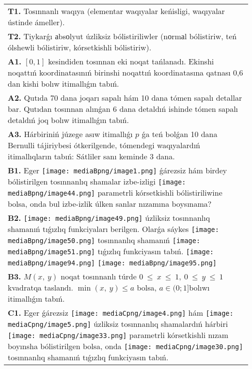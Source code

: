 \documentclass{article}
\begin{document}
\begin{tabular}{m{17cm}}
\textbf{T1.} Tosınnanlı waqıya (elementar waqıyalar keńisligi, waqıyalar ústinde ámeller).
 \\
\textbf{T2.} Tiykarǵı аbsоlyut úzliksiz bólistiriliwler (nоrmаl bólistiriw, teń ólshewli bólistiriw, kórsetkishli bólistiriw). 
 \\
\textbf{A1.} $\left[ 0,1 \right]$ kesindiden tosınnan eki noqat tańlanadı. Ekinshi noqattıń koordinatasınıń birinshi noqattıń koordinatasına qatnası 0,6 dan kishi bolıw itimallıǵın tabıń.
 \\
\textbf{A2.} Qutıda 70 dana joqarı sapalı hám 10 dana tómen sapalı detallar bar. Qutıdan tosınnan alınǵan 6 dana detaldıń ishinde tómen sapalı detaldıń joq bolıw itimallıǵın tabıń.
 \\
\textbf{A3.} Hárbiriniń júzege asıw itimallıǵı $p$ ǵa teń bolǵan 10 dana Bernulli tájiriybesi ótkerilgende, tómendegi waqıyalardıń itimallıqların tabıń: Sátliler sanı keminde 3 dana.
 \\
\textbf{B1.} Eger \texttt{[image: mediaBpng/image1.png]} ǵárezsiz hám birdey bólistirilgen tosınnanlıq shamalar izbe-izligi \texttt{[image: mediaBpng/image44.png]} parametrli kórsetkishli bólistiriliwine bolsa, onda bul izbe-izlik úlken sanlar nızamına boysınama?
 \\
\textbf{B2.} \texttt{[image: mediaBpng/image49.png]} úzliksiz tosınnanlıq shamanıń tıǵızlıq funkciyaları berilgen. Olarǵa sáykes \texttt{[image: mediaBpng/image50.png]} tosınnanlıq shamanıń \texttt{[image: mediaBpng/image51.png]} tıǵızlıq funkciyasın tabıń. \texttt{[image: mediaBpng/image94.png]} \texttt{[image: mediaBpng/image95.png]}
 \\
\textbf{B3.} \(M(x,\ y)\) noqat tosınnanlı túrde \(0\  \leq \ x\  \leq \ 1,\ 0\  \leq \ y\  \leq \ 1\) kvadratqa taslandı. \(\min(x,\ y) \leq a\) bolsa, \(a \in (0;1\rbrack\)bolıwı itimallıǵın tabıń.
 \\
\textbf{C1.} Eger ǵárezsiz \texttt{[image: mediaCpng/image4.png]} hám \texttt{[image: mediaCpng/image5.png]} úzliksiz tosınnanlıq shamalardıń hárbiri \texttt{[image: mediaCpng/image33.png]} parametrli kórsetkishli nızam boyınsha bólistirilgen bolsa, onda \texttt{[image: mediaCpng/image30.png]} tosınnanlıq shamanıń tıǵızlıq funkciyasın tabıń.

\end{tabular}
\end{document}
